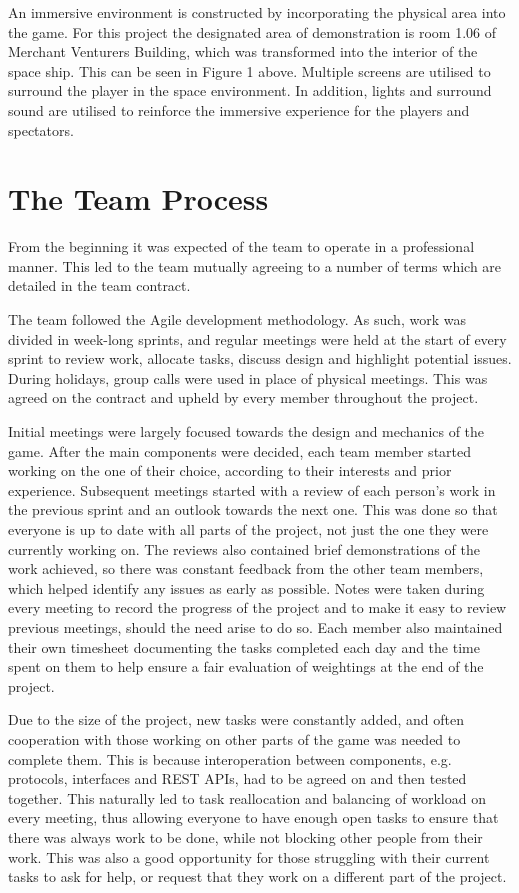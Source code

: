 \documentclass[a4paper,11pt]{article}
\begin{document}
An immersive environment is constructed by incorporating the physical area into the game. For this project the designated area of demonstration is room 1.06 of Merchant Venturers Building, which was transformed into the interior of the space ship. This can be seen in Figure 1 above. Multiple screens are utilised to surround the player in the space environment. In addition, lights and surround sound are utilised to reinforce the immersive experience for the players and spectators. 

\section{The Team Process}

From the beginning it was expected of the team to operate in a professional manner. This led to the team mutually agreeing to a number of terms which are detailed in the team contract.

The team followed the Agile development methodology. As such, work was divided in week-long sprints, and regular meetings were held at the start of every sprint to review work, allocate tasks, discuss design and highlight potential issues. During holidays, group calls were used in place of physical meetings. This was agreed on the contract and upheld by every member throughout the project.

Initial meetings were largely focused towards the design and mechanics of the game. After the main components were decided, each team member started working on the one of their choice, according to their interests and prior experience. Subsequent meetings started with a review of each person’s work in the previous sprint and an outlook towards the next one. This was done so that everyone is up to date with all parts of the project, not just the one they were currently working on. The reviews also contained brief demonstrations of the work achieved, so there was constant feedback from the other team members, which helped identify any issues as early as possible. Notes were taken during every meeting to record the progress of the project and to make it easy to review previous meetings, should the need arise to do so. Each member also maintained their own timesheet documenting the tasks completed each day and the time spent on them to help ensure a fair evaluation of weightings at the end of the project.

Due to the size of the project, new tasks were constantly added, and often cooperation with those working on other parts of the game was needed to complete them. This is because interoperation between components, e.g. protocols, interfaces and REST APIs, had to be agreed on and then tested together. This naturally led to task reallocation and balancing of workload on every meeting, thus allowing everyone to have enough open tasks to ensure that there was always work to be done, while not blocking other people from their work. This was also a good opportunity for those struggling with their current tasks to ask for help, or request that they work on a different part of the project.
\end{document}
